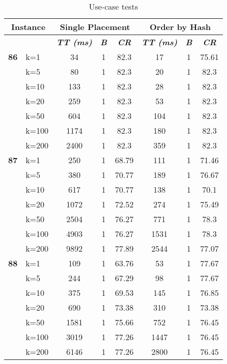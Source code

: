     \begin{table}[htbp]
    \caption{Use-case tests}
    \begin{tabular}{|l|l|c|c|c|c|c|c|}
    
    \multicolumn{ 2}{|c|}{\textbf{Instance}} & \multicolumn{ 3}{c|}{\textbf{Single Placement}} & \multicolumn{ 3}{c|}{\textbf{Order by Hash}} \\ \hline
    \multicolumn{ 2}{|l|}{} & \textbf{\textit{TT (ms)}} & \textbf{\textit{B}} & \textbf{\textit{CR}} & \textbf{\textit{TT (ms)}} & \textbf{\textit{B}} & \textbf{\textit{CR}} \\ \hline
    \multicolumn{1}{|r|}{\textbf{86}} & k=1 & 34 & 1 & 82.3 & 17 & 1 & 75.61 \\ 
     & k=5 & 80 & 1 & 82.3 & 20 & 1 & 82.3 \\ 
     & k=10 & 133 & 1 & 82.3 & 28 & 1 & 82.3 \\ 
     & k=20 & 259 & 1 & 82.3 & 53 & 1 & 82.3 \\ 
     & k=50 & 604 & 1 & 82.3 & 104 & 1 & 82.3 \\ 
     & k=100 & 1174 & 1 & 82.3 & 180 & 1 & 82.3 \\ 
     & k=200 & 2400 & 1 & 82.3 & 359 & 1 & 82.3 \\ \hline
    \multicolumn{1}{|r|}{\textbf{87}} & k=1 & 250 & 1 & 68.79 & 111 & 1 & 71.46 \\ 
     & k=5 & 380 & 1 & 70.77 & 189 & 1 & 76.67 \\ 
     & k=10 & 617 & 1 & 70.77 & 138 & 1 & 70.1 \\ 
     & k=20 & 1072 & 1 & 72.52 & 274 & 1 & 75.49 \\ 
     & k=50 & 2504 & 1 & 76.27 & 771 & 1 & 78.3 \\ 
     & k=100 & 4903 & 1 & 76.27 & 1531 & 1 & 78.3 \\ 
     & k=200 & 9892 & 1 & 77.89 & 2544 & 1 & 77.07 \\ \hline
    \multicolumn{1}{|r|}{\textbf{88}} & k=1 & 109 & 1 & 63.76 & 53 & 1 & 77.67 \\ 
     & k=5 & 244 & 1 & 67.29 & 98 & 1 & 77.67 \\ 
     & k=10 & 375 & 1 & 69.53 & 145 & 1 & 76.85 \\ 
     & k=20 & 690 & 1 & 73.38 & 310 & 1 & 73.38 \\ 
     & k=50 & 1581 & 1 & 75.66 & 752 & 1 & 76.45 \\ 
     & k=100 & 3019 & 1 & 77.26 & 1447 & 1 & 76.45 \\ 
     & k=200 & 6146 & 1 & 77.26 & 2800 & 1 & 76.45 \\ \hline

\end{tabular}
\end{table}
